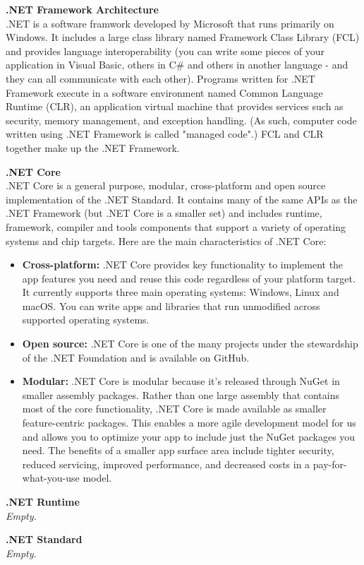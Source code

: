 \textbf{.NET Framework Architecture} \\
.NET is a software framwork developed by Microsoft that runs primarily on Windows.
It includes a large class library named Framework Class Library (FCL) and provides language interoperability (you can write some pieces of your application in Visual Basic, others in C\# and others in another language - and they can all communicate with each other). Programs written for .NET Framework execute in a software environment named Common Language Runtime (CLR), an application virtual machine that provides services such as security, memory management, and exception handling. (As such, computer code written using .NET Framework is called "managed code".) FCL and CLR together make up the .NET Framework.

\textbf{.NET Core} \cite{software:NETCore} \\
.NET Core is a general purpose, modular, cross-platform and open source implementation of the .NET Standard. It contains many of the same APIs as the .NET Framework (but .NET Core is a smaller set) and includes runtime, framework, compiler and tools components that support a variety of operating systems and chip targets. Here are the main characteristics of .NET Core: 
\begin{itemize}
    \item \textbf{Cross-platform:} .NET Core provides key functionality to implement the app features you need and reuse this code regardless of your platform target. It currently supports three main operating systems: Windows, Linux and macOS. You can write apps and libraries that run unmodified across supported operating systems. 
    
    \item \textbf{Open source:} .NET Core is one of the many projects under the stewardship of the .NET Foundation and is available on GitHub. 
    
   \item \textbf{Modular:} .NET Core is modular because it's released through NuGet in smaller assembly packages. Rather than one large assembly that contains most of the core functionality, .NET Core is made available as smaller feature-centric packages. This enables a more agile development model for us and allows you to optimize your app to include just the NuGet packages you need. The benefits of a smaller app surface area include tighter security, reduced servicing, improved performance, and decreased costs in a pay-for-what-you-use model.
\end{itemize}







\textbf{.NET Runtime } \\
\textit{Empty.}


\textbf{.NET Standard} \\
\textit{Empty.}

